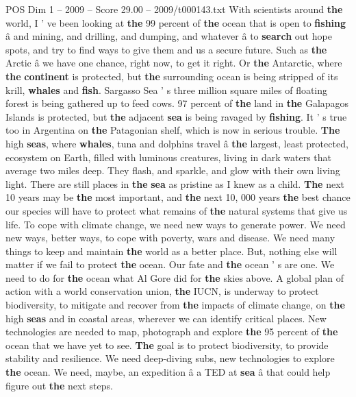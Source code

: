 \begin{textsample}{POS Dim 1 – 2009 – Score 29.00 – 2009/t000143.txt}
With scientists around \textbf{the} world, I ' ve been looking at \textbf{the} 99 percent of \textbf{the} ocean that is open to \textbf{fishing} â and mining, and drilling, and dumping, and whatever â to \textbf{search} out hope spots, and try to find ways to give them and us a secure future.
Such as \textbf{the} Arctic â we have one chance, right now, to get it right.
Or \textbf{the} Antarctic, where \textbf{the} \textbf{continent} is protected, but \textbf{the} surrounding ocean is being stripped of its krill, \textbf{whales} and \textbf{fish}.
Sargasso Sea ' s three million square miles of floating forest is being gathered up to feed cows. 97 percent of \textbf{the} land in \textbf{the} Galapagos Islands is protected, but \textbf{the} adjacent \textbf{sea} is being ravaged by \textbf{fishing}.
It ' s true too in Argentina on \textbf{the} Patagonian shelf, which is now in serious trouble. \textbf{The} high \textbf{seas}, where \textbf{whales}, tuna and dolphins travel â \textbf{the} largest, least protected, ecosystem on Earth, filled with luminous creatures, living in dark waters that average two miles deep.
They flash, and sparkle, and glow with their own living light.
There are still places in \textbf{the} \textbf{sea} as pristine as I knew as a child. \textbf{The} next 10 years may be \textbf{the} most important, and \textbf{the} next 10, 000 years \textbf{the} best chance our species will have to protect what remains of \textbf{the} natural systems that give us life.
To cope with climate change, we need new ways to generate power.
We need new ways, better ways, to cope with poverty, wars and disease.
We need many things to keep and maintain \textbf{the} world as a better place.
But, nothing else will matter if we fail to protect \textbf{the} ocean.
Our fate and \textbf{the} ocean ' s are one.
We need to do for \textbf{the} ocean what Al Gore did for \textbf{the} skies above.
A global plan of action with a world conservation union, \textbf{the} IUCN, is underway to protect biodiversity, to mitigate and recover from \textbf{the} impacts of climate change, on \textbf{the} high \textbf{seas} and in coastal areas, wherever we can identify critical places.
New technologies are needed to map, photograph and explore \textbf{the} 95 percent of \textbf{the} ocean that we have yet to see. \textbf{The} goal is to protect biodiversity, to provide stability and resilience.
We need deep-diving subs, new technologies to explore \textbf{the} ocean.
We need, maybe, an expedition â a TED at \textbf{sea} â that could help figure out \textbf{the} next steps.

\end{textsample}
